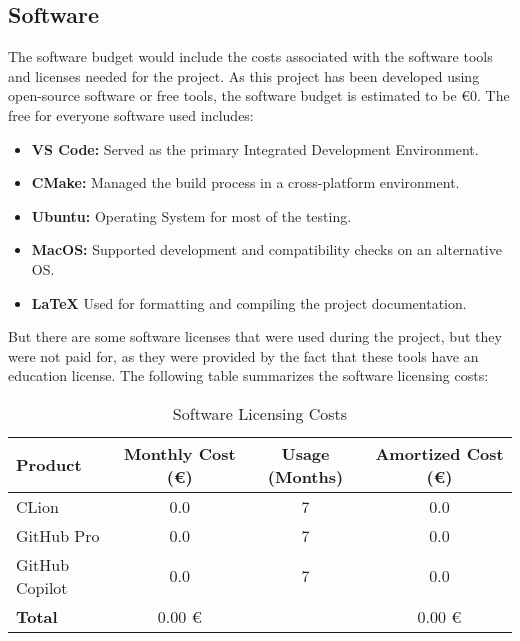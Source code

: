 \subsection{Software}
The software budget would include the costs associated with the software tools and licenses needed for the project. As this project has been developed using open-source software or free tools, the software budget is estimated to be €0. The free for everyone software used includes:
\begin{itemize}
    \item \textbf{VS Code:} Served as the primary Integrated Development Environment.
    \item \textbf{CMake:} Managed the build process in a cross-platform environment.
    \item \textbf{Ubuntu:} Operating System for most of the testing.
    \item \textbf{MacOS:} Supported development and compatibility checks on an alternative OS.
    \item \textbf{\LaTeX } Used for formatting and compiling the project documentation.
\end{itemize}

But there are some software licenses that were used during the project, but they were not paid for, as they were provided by the fact that these tools have an education license. The following table summarizes the software licensing costs:

\begin{table}[h]
  \centering
  \caption{Software Licensing Costs}
  \label{tab:software-licensing-costs}
  \begin{tabular}{l|c|c|c}
    \hline
    \textbf{Product}     & \textbf{Monthly Cost (€)} & \textbf{Usage (Months)} & \textbf{Amortized Cost (€)} \\
    \hline
    CLion                & 0.0                       & 7                       & 0.0 \\
    GitHub Pro           & 0.0                       & 7                       & 0.0 \\
    GitHub Copilot       & 0.0                       & 7                       & 0.0 \\
    \hline
    \textbf{Total}       & 0.00 €                    &                         & 0.00 € \\
    \hline
  \end{tabular}
\end{table}


